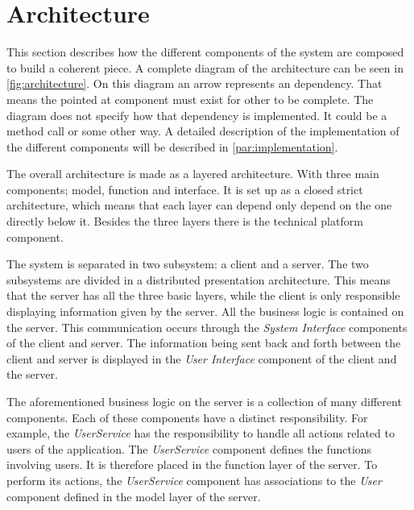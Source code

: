 \section{Architecture}
\label{sec:architecture}

This section describes how the different components of the system are
composed to build a coherent piece. A complete diagram of the
architecture can be seen in \cref{fig:architecture}. On this diagram an arrow represents an dependency. That means the pointed at component must exist for other to be complete. The diagram does not specify how that dependency is implemented. It could be a method call or some other way. A detailed description of the implementation of the different components will be described in \cref{par:implementation}.

The overall architecture is made as a layered architecture. With three main components; model, function and interface. It is set up as a closed strict architecture, which means that each layer can depend only depend on the one directly below it. Besides the three layers there is the technical platform component.

The system is separated in two subsystem: a client and a server. The two subsystems are divided in a distributed presentation architecture. This means that the server has all the three basic layers, while the client is only responsible displaying
information given by the server. All the business logic is contained on the
server. This communication occurs through the \textit{System Interface}
components of the client and server. The information being sent back and
forth between the client and server is displayed in the \textit{User Interface}
component of the client and the server.

The aforementioned business logic on the server is a collection of
many different components. Each of these components have a distinct
responsibility. For example, the \textit{UserService} has the responsibility to
handle all actions related to users of the application. The
\textit{UserService} component defines the functions involving users. It is
therefore placed in the function layer of the server. To perform its
actions, the \textit{UserService} component has associations to the \textit{User}
component defined in the model layer of the server.

